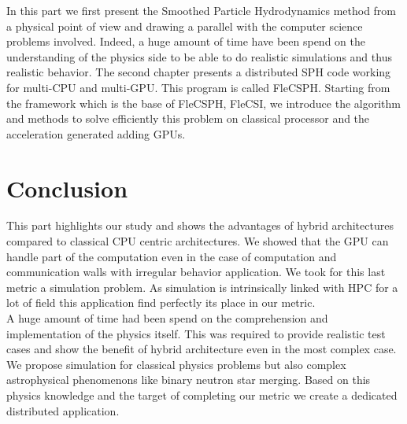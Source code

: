 In this part we first present the Smoothed Particle Hydrodynamics method from a physical point of view and drawing a parallel with the computer science problems involved. 
Indeed, a huge amount of time have been spend on the understanding of the physics side to be able to do realistic simulations and thus realistic behavior. 
The second chapter presents a distributed SPH code working for multi-CPU and multi-GPU. 
This program is called FleCSPH. 
Starting from the framework which is the base of FleCSPH, FleCSI, we introduce the algorithm and methods to solve efficiently this problem on classical processor and the acceleration generated adding GPUs. 







\chapter*{Conclusion}
This part highlights our study and shows the advantages of hybrid architectures compared to classical CPU centric architectures. 
We showed that the GPU can handle part of the computation even in the case of computation and communication walls with irregular behavior application. 
We took for this last metric a simulation problem. 
As simulation is intrinsically linked with HPC for a lot of field this application find perfectly its place in our metric.\\

A huge amount of time had been spend on the comprehension and implementation of the physics itself. 
This was required to provide realistic test cases and show the benefit of hybrid architecture even in the most complex case. 
We propose simulation for classical physics problems but also complex astrophysical phenomenons like binary neutron star merging. 
Based on this physics knowledge and the target of completing our metric we create a dedicated distributed application.

